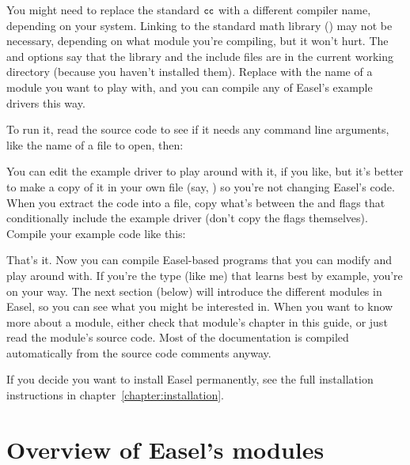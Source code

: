 \begin{cchunk}
\end{cchunk}

You might need to replace the standard ${\small\texttt{cc}}$ with a different
compiler name, depending on your system. Linking to the standard math
library () may not be necessary, depending on what module
you're compiling, but it won't hurt. The  and 
options say that the library and the include files are in the current
working directory (because you haven't installed them). Replace
 with the name of a module you want to play with, and you
can compile any of Easel's example drivers this way.

To run it, read the source code to see if it needs any command line
arguments, like the name of a file to open, then:

\begin{cchunk}
\end{cchunk}

You can edit the example driver to play around with it, if you like,
but it's better to make a copy of it in your own file (say,
) so you're not changing Easel's code. When you
extract the code into a file, copy what's between the  and  flags that
conditionally include the example driver (don't copy the flags
themselves).  Compile your example code like this:

\begin{cchunk}
\end{cchunk}

That's it. Now you can compile Easel-based programs that you can
modify and play around with. If you're the type (like me) that learns
best by example, you're on your way. The next section (below) will
introduce the different modules in Easel, so you can see what you
might be interested in. When you want to know more about a module,
either check that module's chapter in this guide, or just read the
module's source code. Most of the documentation is compiled
automatically from the source code comments anyway.

If you decide you want to install Easel permanently, see the full
installation instructions in chapter~\ref{chapter:installation}.

\section{Overview of Easel's modules}

